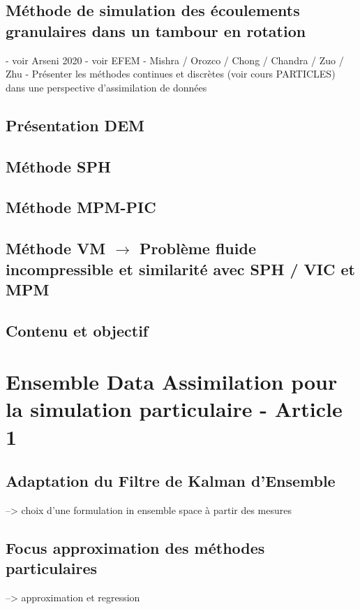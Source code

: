 \documentclass{article}
\begin{document}
\subsection{Méthode de simulation des écoulements granulaires dans un tambour en rotation}

- voir Arseni 2020
- voir EFEM
- Mishra / Orozco / Chong / Chandra / Zuo / Zhu
- Présenter les méthodes continues et discrètes (voir cours PARTICLES) dans une perspective d'assimilation de données

\subsection{Présentation DEM}

\subsection{Méthode SPH}
\subsection{Méthode MPM-PIC}
\subsection{Méthode VM $\rightarrow$ Problème fluide incompressible et similarité avec SPH / VIC et MPM}

\subsection{Contenu et objectif}

\section{Ensemble Data Assimilation pour la simulation particulaire - Article 1}

\subsection{Adaptation du Filtre de Kalman d'Ensemble}
--> choix d'une formulation in ensemble space à partir des mesures

\subsection{Focus approximation des méthodes particulaires}
--> approximation et regression
\end{document}
